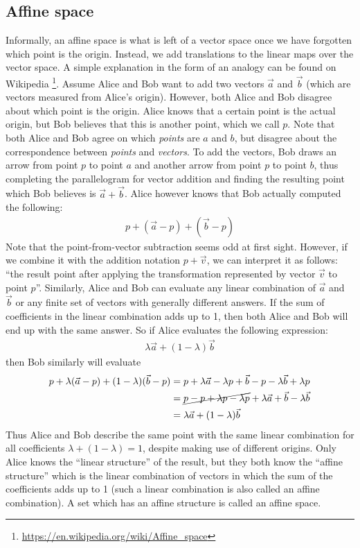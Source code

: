 \subsection{Affine space}
Informally, an affine space is what is left of a vector space once we have forgotten which point is the origin. Instead, we add translations to the linear maps over the vector space.
A simple explanation in the form of an analogy can be found on Wikipedia%
\footnote{\url{https://en.wikipedia.org/wiki/Affine_space}}.
Assume Alice and Bob want to add two vectors $\vec{a}$ and $\vec{b}$ (which are vectors measured from Alice's origin). 
However, both Alice and Bob disagree about which point is the origin. Alice knows that a certain point is the actual origin, but Bob believes that this is another point, which we call $p$.
Note that both Alice and Bob agree on which \textit{points} are $a$ and $b$, but disagree about the correspondence between \textit{points} and \textit{vectors}.
To add the vectors, Bob draws an arrow from point $p$ to point $a$ and another arrow from point $p$ to point $b$, thus completing the parallelogram for vector addition and finding the resulting point which Bob believes is $\vec{a} + \vec{b}$.
Alice however knows that Bob actually computed the following:
%
\begin{align*}
p + (\vec{a}- p) + (\vec{b} - p)
\end{align*}
%
Note that the point-from-vector subtraction seems odd at first sight.
However, if we combine it with the addition notation $p + \vec{v}$, we can interpret it as follows: ``the result point after applying the transformation represented by vector $\vec{v}$ to point $p$''.
Similarly, Alice and Bob can evaluate any linear combination of $\vec{a}$ and $\vec{b}$ or any finite set of vectors with generally different answers.
If the sum of coefficients in the linear combination adds up to 1, then both Alice and Bob will end up with the same answer. So if Alice evaluates the following expression:
%
\begin{align*}
\lambda \vec{a} + (1 - \lambda) \vec{b}
\end{align*}
%
then Bob similarly will evaluate
%
\begin{align*}
p + \lambda (\vec{a} - p) + (1-\lambda)(\vec{b} - p) &= p + \lambda \vec{a} - \lambda p + \vec{b} - p - \lambda \vec{b} + \lambda p \\
&= \cancel{p - p + \lambda p - \lambda p} + \lambda \vec{a} + \vec{b} - \lambda \vec{b} \\
&= \lambda \vec{a} + (1 - \lambda) \vec{b}
\end{align*}
%
Thus Alice and Bob describe the same point with the same linear combination for all coefficients $\lambda + (1 - \lambda) = 1$, despite making use of different origins.
Only Alice knows the ``linear structure'' of the result, but they both know the ``affine structure'' which is the linear combination of vectors in which the sum of the coefficients adds up to 1 (such a linear combination is also called an affine combination).
A set which has an affine structure is called an affine space.

